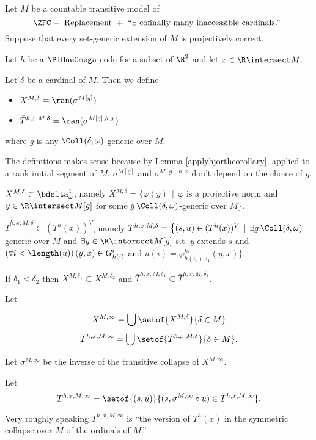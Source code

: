\documentclass[oneside,12pt]{amsart}
\begin{document}
\begin{definition}
\label{TInfinity}
Let $M$ be a countable transitive model of
$$\ZFC - \text{ Replacement } +
\text{ ``} \exists \text{ cofinally many inaccessible cardinals.'' }$$
Suppose that every set-generic extension of $M$ is projectively correct.

Let $h$ be a $\PiOneOmega$ code for a subset
of $\R^2$ and let $x\in\R\intersect M$.


Let $\delta$ be a cardinal of $M$. Then we define
\begin{itemize}
\item $X^{M,\delta} = \ran(\sigma^{M[g]})$
\item $\bar{T}^{h,x,M,\delta}=\ran(\sigma^{M[g],h,x})$
\end{itemize}
where $g$ is any
$\Coll(\delta,\omega)$-generic over $M$.

The definitions makes sense because by Lemma \ref{applyhjorthcorollary},
applied to a rank initial segment of $M$,
$\sigma^{M[g]}$ and $\sigma^{M[g],h,x}$ don't depend on the choice of $g$.


$X^{M,\delta}\subset \bdelta^1_{\omega}$, namely
$X^{M,\delta}=\big\{ \varphi(y)\, \mid \, \varphi$ is a projective norm and $y\in\R\intersect M[g]$ for
some $g\, \Coll(\delta,\omega)$-generic over $M \big\}$.


$\bar{T}^{h,x,M,\delta}\subset (T^h(x))^{V}$, namely
$\bar{T}^{h,x,M,\delta}=\big\{(s,u)\in (T^h(x))^{V} \, \mid \,
\exists g\, \Coll(\delta,\omega)$-generic over $M$ and $\exists y \in \R\intersect M[g]$ s.t.
$y$ extends $s$ and $(\forall i<\length(u))\, (y,x)\in G^{i}_{h(i)}$ and
$u(i)=\varphi^{i_0}_{h(i_0),i_1}(y,x) \big\}$.


If $\delta_1<\delta_2$ then $X^{M,\delta_1}\subset X^{M,\delta_2}$ and
$\bar{T}^{h,x,M,\delta_1}\subset \bar{T}^{h,x,M,\delta_2}$.

Let

$$X^{M,\infty}=\bigcup\setof{X^{M,\delta}}{\delta\in M}$$
$$\bar{T}^{h,x,M,\infty}=\bigcup\setof{\bar{T}^{h,x,M,\delta}}{\delta\in M}.$$

Let $\sigma^{M,\infty}$ be the inverse of the transitive collapse of $X^{M,\infty}$.

Let
$$T^{h,x,M,\infty}=\setof{(s,u)}{(s,\sigma^{M,\infty}\circ u)\in \bar{T}^{h,x,M,\infty}}.$$
\end{definition}

Very roughly speaking $T^{h,x,M,\infty}$ is ``the version of $T^h(x)$ in the symmetric collapse
over $M$ of the ordinals of $M$.''
\end{document}
